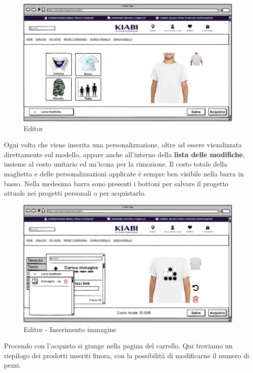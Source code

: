 \documentclass[12pt,italian,]{report}
\begin{document}
\begin{figure}[h]
\centering
\includegraphics{img/balsamiq/Editorbase.png}
\caption{Editor}
\end{figure}

Ogni volta che viene inserita una personalizzazione, oltre ad essere
visualizzata direttamente sul modello, appare anche all'interno della
\textbf{lista delle modifiche}, insieme al costo unitario ed un'icona
per la rimozione. Il costo totale della maglietta e delle
personalizzazioni applicate è sempre ben visibile nella barra in basso.
Nella medesima barra sono presenti i bottoni per salvare il progetto
attuale nei progetti personali o per acquistarlo.

\begin{figure}[h]
\centering
\includegraphics{img/balsamiq/Editor-caratteristicabustoimmagine4.png}
\caption{Editor - Inserimento immagine}
\end{figure}

Procendo con l'acquisto si giunge nella pagina del carrello. Qui
troviamo un riepilogo dei prodotti inseriti finora, con la possibilità
di modificarne il numero di pezzi.
\end{document}
